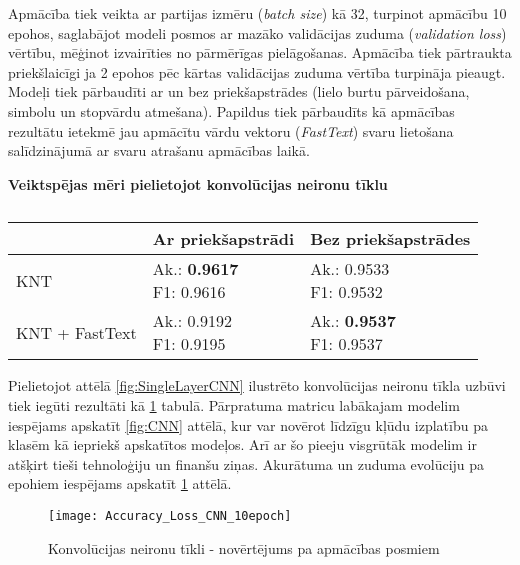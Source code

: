 \pagebreak
Apmācība tiek veikta ar partijas izmēru (\textit{batch size}) kā 32, turpinot apmācību 10 epohos, saglabājot modeli posmos ar mazāko validācijas zuduma (\textit{validation loss}) vērtību, mēģinot izvairīties no pārmērīgas pielāgošanas. Apmācība tiek pārtraukta priekšlaicīgi ja 2 epohos pēc kārtas validācijas zuduma vērtība turpināja pieaugt. Modeļi tiek pārbaudīti ar un bez priekšapstrādes (lielo burtu pārveidošana, simbolu un stopvārdu atmešana). Papildus tiek pārbaudīts kā apmācības rezultātu ietekmē jau apmācītu vārdu vektoru (\textit{FastText}) svaru lietošana salīdzinājumā ar svaru atrašanu apmācības laikā.

\begin{table}[H]
\centering
\caption{\label{tab:score_cnn}}
\textbf{Veiktspējas mēri pielietojot konvolūcijas neironu tīklu\\}
\begin{tabular}{|l|l|l|}
\hline
                                      & Ar priekšapstrādi & Bez priekšapstrādes \\ \hline
KNT                                   &   \makecell{Ak.: \textbf{0.9617} \\ F1: 0.9616}            &  \makecell{Ak.: 0.9533 \\ F1:  0.9532}               \\ \hline
KNT + FastText                        &  \makecell{Ak.: 0.9192 \\ F1:  0.9195}             &  \makecell{Ak.: \textbf{0.9537} \\ F1: 0.9537}               \\ \hline  
\end{tabular}
\end{table}

Pielietojot attēlā \ref{fig:SingleLayerCNN} ilustrēto konvolūcijas neironu tīkla uzbūvi tiek iegūti rezultāti kā \ref{tab:score_cnn} tabulā. Pārpratuma matricu labākajam modelim iespējams apskatīt \ref{fig:CNN} attēlā, kur var novērot līdzīgu kļūdu izplatību pa klasēm kā iepriekš apskatītos modeļos. Arī ar šo pieeju visgrūtāk modelim ir atšķirt tieši tehnoloģiju un finanšu ziņas. Akurātuma un zuduma evolūciju pa epohiem iespējams apskatīt \ref{fig:Accuracy_Loss_CNN_10epoch} attēlā.

\begin{figure}[H]
	\texttt{[image: Accuracy\_Loss\_CNN\_10epoch]}
	\caption{Konvolūcijas neironu tīkli - novērtējums pa apmācības posmiem}
	\label{fig:Accuracy_Loss_CNN_10epoch}
\end{figure}

